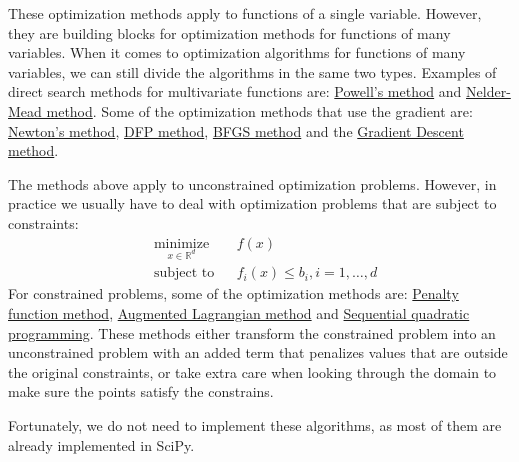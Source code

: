 \documentclass[12pt, a4paper]{article}
\begin{document}
These optimization methods apply to functions of a single variable.
However, they are building blocks for optimization methods for functions of many variables.
When it comes to optimization algorithms for functions of many variables, we can still divide the algorithms in the same two types.
Examples of direct search methods for multivariate functions are: \href{https://en.wikipedia.org/wiki/Powell's\_method}{Powell's method} and \href{https://en.wikipedia.org/wiki/Nelder–Mead\_method}{Nelder-Mead method}.
Some of the optimization methods that use the gradient are: \href{https://en.wikipedia.org/wiki/Newton's\_method}{Newton's method}, \href{https://en.wikipedia.org/wiki/Davidon–Fletcher–Powell\_formula}{DFP method}, \href{https://en.wikipedia.org/wiki/Broyden–Fletcher–Goldfarb–Shanno\_algorithm}{BFGS method} and the \href{https://en.wikipedia.org/wiki/Gradient\_descent}{Gradient Descent method}.

The methods above apply to unconstrained optimization problems.
However, in practice we usually have to deal with optimization problems that are subject to constraints:
\begin{equation*}
\begin{aligned}
& \underset{x\in\mathbb{R}^d}{\text{minimize}}
& & f(x)\\
& \text{subject to}
& & f_i(x) \leq b_i, i=1,\ldots, d
\end{aligned}
\end{equation*}
For constrained problems, some of the optimization methods are: \href{https://en.wikipedia.org/wiki/Penalty\_method}{Penalty function method}, \href{https://en.wikipedia.org/wiki/Augmented\_Lagrangian\_method}{Augmented Lagrangian method} and \href{https://en.wikipedia.org/wiki/Sequential\_quadratic\_programming}{Sequential quadratic programming}.
These methods either transform the constrained problem into an unconstrained problem with an added term that penalizes values that are outside the original constraints, or take extra care when looking through the domain to make sure the points satisfy the constrains.

Fortunately, we do not need to implement these algorithms, as most of them are already implemented in SciPy.
\end{document}
